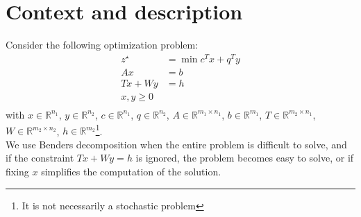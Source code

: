\documentclass[12pt, openany]{report}
\newcommand{\R}{\mathbb{R}}
\theoremstyle{definition}
\begin{document}
\section{Context and description}
Consider the following optimization problem:
\begin{equation}
	\begin{aligned}
		z^\star &= \min c^Tx + q^Ty\\
		Ax&=b\\
		Tx + Wy&=h\\
		x, y\geq0\\
	\end{aligned}
\end{equation}
with $x\in \R^{n_1}$, $y\in \R^{n_2}$, $c\in \R^{n_1}$, $q\in \R^{n_2}$, $A\in \R^{m_1\times n_1}$, $b\in \R^{m_1}$, $T\in \R^{m_2\times n_1}$, $W\in \R^{m_2\times n_2}$, $h\in \R^{m_2}$\footnote{It is not necessarily a stochastic problem}.\\
We use Benders decomposition when the entire problem is difficult to solve, and if the constraint $Tx+Wy=h$ is ignored, the problem becomes easy to solve, or if fixing $x$ simplifies the computation of the solution. 
\end{document}
